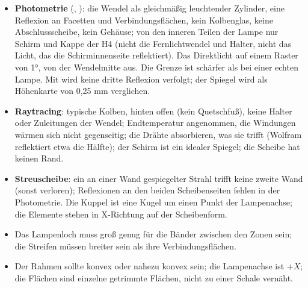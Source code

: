 \begin{itemize}
  \item \textbf{Photometrie} (, ): die Wendel als
    gleichmäßig leuchtender Zylinder, eine Reflexion an Facetten und Verbindungsflächen, kein
    Kolbenglas, keine Abschlussscheibe, kein Gehäuse; von den inneren Teilen der Lampe nur Schirm und
    Kappe der H4 (nicht die Fernlichtwendel und Halter, nicht das Licht, das die Schirminnenseite
    reflektiert). Das Direktlicht auf einem Raster von \ang{1}, von der Wendelmitte aus. Die Grenze ist
    schärfer als bei einer echten Lampe. Mit  wird keine dritte Reflexion
    verfolgt; der Spiegel wird als Höhenkarte von 0,25 mm verglichen.
  \item \textbf{Raytracing}: typische Kolben, hinten offen (kein Quetschfuß), keine Halter oder
    Zuleitungen der Wendel; Endtemperatur angenommen, die Windungen wärmen sich nicht gegenseitig; die
    Drähte absorbieren, was sie trifft (Wolfram reflektiert etwa die Hälfte); der Schirm ist ein idealer
    Spiegel; die Scheibe hat keinen Rand.
  \item \textbf{Streuscheibe}: ein an einer Wand gespiegelter Strahl trifft keine zweite Wand (sonst
    verloren); Reflexionen an den beiden Scheibenseiten fehlen in der Photometrie. Die Kuppel ist eine
    Kugel um einen Punkt der Lampenachse; die Elemente stehen in X-Richtung auf der Scheibenform.
  \item Das Lampenloch muss groß genug für die Bänder zwischen den Zonen sein; die Streifen müssen
    breiter sein als ihre Verbindungsflächen.
  \item Der Rahmen sollte konvex oder nahezu konvex sein; die Lampenachse ist $+X$; die Flächen sind
    einzelne getrimmte Flächen, nicht zu einer Schale vernäht.
\end{itemize}
